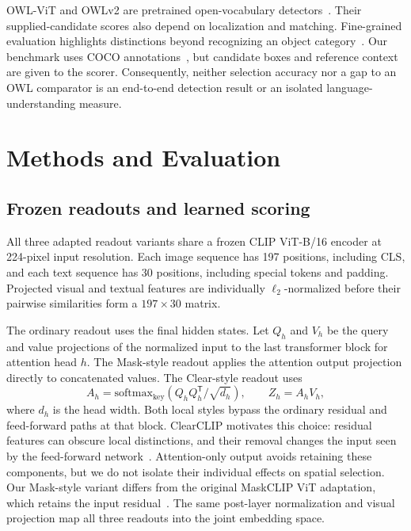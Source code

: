 \documentclass[10pt,twocolumn,letterpaper]{article}
\begin{document}
OWL-ViT and OWLv2 are pretrained open-vocabulary detectors~\citep{minderer2022owlvit,minderer2023owlv2}. Their supplied-candidate scores also depend on localization and matching. Fine-grained evaluation highlights distinctions beyond recognizing an object category~\citep{bianchi2023fgovd}. Our benchmark uses COCO annotations~\citep{lin2014coco}, but candidate boxes and reference context are given to the scorer. Consequently, neither selection accuracy nor a gap to an OWL comparator is an end-to-end detection result or an isolated language-understanding measure.
\clearpage

\section{Methods and Evaluation}
\subsection{Frozen readouts and learned scoring}
All three adapted readout variants share a frozen CLIP ViT-B/16 encoder at 224-pixel input resolution. Each image sequence has 197 positions, including CLS, and each text sequence has 30 positions, including special tokens and padding. Projected visual and textual features are individually $\ell_2$-normalized before their pairwise similarities form a $197\times30$ matrix.

The ordinary readout uses the final hidden states. Let $Q_h$ and $V_h$ be the query and value projections of the normalized input to the last transformer block for attention head $h$. The Mask-style readout applies the attention output projection directly to concatenated values. The Clear-style readout uses
\begin{equation}
 A_{h}=\mathrm{softmax}_{\mathrm{key}}(Q_{h}Q_{h}^{\mathsf{T}}/\sqrt{d_h}),
 \qquad Z_{h}=A_{h}V_{h},
\end{equation}
where $d_h$ is the head width. Both local styles bypass the ordinary residual and feed-forward paths at that block. ClearCLIP motivates this choice: residual features can obscure local distinctions, and their removal changes the input seen by the feed-forward network~\citep{lan2024clearclip}. Attention-only output avoids retaining these components, but we do not isolate their individual effects on spatial selection. Our Mask-style variant differs from the original MaskCLIP ViT adaptation, which retains the input residual~\citep{zhou2021maskclip}. The same post-layer normalization and visual projection map all three readouts into the joint embedding space.
\end{document}
